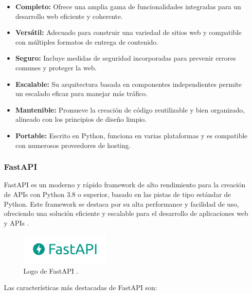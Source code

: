 \begin{itemize}
  \item \textbf{Completo:} Ofrece una amplia gama de funcionalidades integradas para un desarrollo web eficiente y coherente.
  \item \textbf{Versátil:} Adecuado para construir una variedad de sitios web y compatible con múltiples formatos de entrega de contenido.
  \item \textbf{Seguro:} Incluye medidas de seguridad incorporadas para prevenir errores comunes y proteger la web.
  \item \textbf{Escalable:} Su arquitectura basada en componentes independientes permite un escalado eficaz para manejar más tráfico.
  \item \textbf{Mantenible:} Promueve la creación de código reutilizable y bien organizado, alineado con los principios de diseño limpio.
  \item \textbf{Portable:} Escrito en Python, funciona en varias plataformas y es compatible con numerosos proveedores de hosting.
\end{itemize}

\subsubsection{FastAPI}

FastAPI es un moderno y rápido framework de alto rendimiento para la creación
de APIs con Python 3.8 o superior, basado en las pistas de tipo estándar de Python.
Este framework se destaca por su alta performance y facilidad de uso, ofreciendo
una solución eficiente y escalable para el desarrollo de aplicaciones web y APIs
\cite{FastAPI_Official}.

\begin{figure}[!htbp]
  \centering
  \includegraphics[width=0.4\textwidth]{imagenes/02-marco-teorico/fastapi-logo.png}
  \caption[Logo de FastAPI]{Logo de FastAPI \cite{FastAPI_Official}.}
  \label{fig:fastapi-logo}
\end{figure}

Las características más destacadas de FastAPI son:

